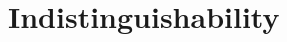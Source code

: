 \newcommand{\lreach}[1]{\textsf{l-reach}(#1)}
\newcommand{\rreach}[1]{\textsf{r-reach}(#1)}
\newcommand{\phifresh}[3]{\textsf{n-fresh}_{#1}(#2; #3)}
\newcommand{\phihfresh}[4]{\textsf{h-fresh}_{#1}^{#2}(#3; #4)}

\section{Indistinguishability}

\newcommand{\pair}[1]{\langle #1 \rangle}



\newcommand{\fold}{\mathsf{fold}}




